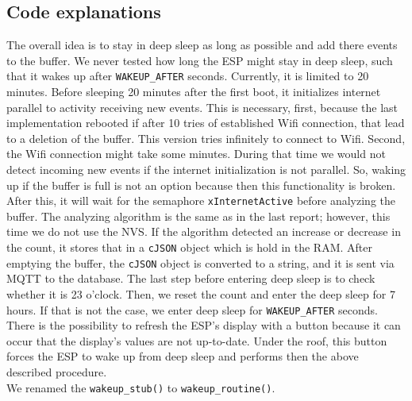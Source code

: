 \subsection{Code explanations}
The overall idea is to stay in deep sleep as long as possible and add there events to the buffer.
We never tested how long the ESP might stay in deep sleep,
such that it wakes up after \verb!WAKEUP_AFTER! seconds. Currently, it is limited to 20 minutes.
Before sleeping 20 minutes after the first boot, it initializes internet parallel to
activity receiving new events. This is necessary, first, because the last implementation
rebooted if after 10 tries of established Wifi connection, that lead to a deletion of the buffer.
This version tries infinitely to connect to Wifi.
Second, the Wifi connection might take some minutes. During that time we would not detect
incoming new events if the internet initialization is not parallel. So, waking up if the buffer is full
is not an option because then this functionality is broken.
After this, it will wait for the semaphore \verb!xInternetActive!
before analyzing the buffer. The analyzing algorithm is the same as in the last report; however,
this time we do not use the NVS. If the algorithm detected an increase or decrease in the count,
it stores that in a \verb!cJSON! object which is hold in the RAM.
After emptying the buffer, the \verb!cJSON! object is converted to a string, and it is sent via MQTT to
the database. The last step before entering deep sleep is to check whether it is 23 o'clock.
Then, we reset the count and enter the deep sleep for 7 hours. If that is not the case,
we enter deep sleep for \verb!WAKEUP_AFTER! seconds.\\
There is the possibility to refresh the ESP's display with a button because it can occur that the display's values
are not up-to-date. Under the roof, this button forces the ESP to wake up from deep sleep and
performs then the above described procedure. \\
We renamed the \verb!wakeup_stub()! to \verb!wakeup_routine()!.





